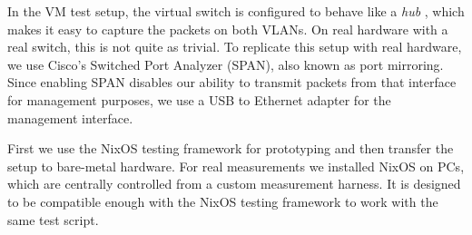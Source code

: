 In the VM test setup, the virtual switch is configured to behave like a \textit{hub} \cite{wiki:Ethernet_hub} \cite{NixOS-VM-test-Hub}, which makes it easy to capture the packets on both VLANs. On real hardware with a real switch, this is not quite as trivial. To replicate this setup with real hardware, we use Cisco's Switched Port Analyzer (SPAN), also known as port mirroring. Since enabling SPAN disables our ability to transmit packets from that interface for management purposes, we use a USB to Ethernet adapter for the management interface.



First we use the NixOS testing framework for prototyping and then transfer the setup to bare-metal hardware.
For real measurements we installed NixOS on PCs, which are centrally controlled from a custom measurement harness. It is designed to be compatible enough with the NixOS testing framework to work with the same test script.